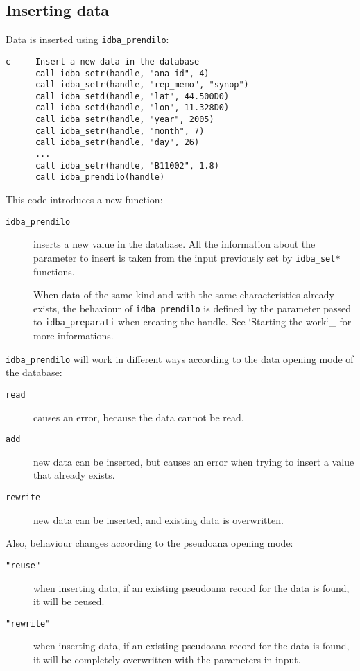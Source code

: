 \documentclass[final,12pt,a4paper,twoside]{book}
\begin{document}
\subsection {Inserting data}

Data is inserted using {\tt idba\_prendilo}:
\label{fun-idba_prendilo}
         
\begin{verbatim}
c     Insert a new data in the database
      call idba_setr(handle, "ana_id", 4)
      call idba_setr(handle, "rep_memo", "synop")
      call idba_setd(handle, "lat", 44.500D0)
      call idba_setd(handle, "lon", 11.328D0)
      call idba_setr(handle, "year", 2005)
      call idba_setr(handle, "month", 7)
      call idba_setr(handle, "day", 26)
      ...
      call idba_setr(handle, "B11002", 1.8)
      call idba_prendilo(handle)
\end{verbatim}

This code introduces a new function:

\begin{description}
\item[{\tt idba\_prendilo}]
  inserts a new value in the database.  All the information about the parameter
  to insert is taken from the input previously set by {\tt idba\_set*} functions.

  When data of the same kind and with the same characteristics already exists,
  the behaviour of {\tt idba\_prendilo} is defined by the parameter passed to
  {\tt idba\_preparati} when creating the handle.  See `Starting the work`\_ for
  more informations.
\end{description}

{\tt idba\_prendilo} will work in different ways according to the data opening
mode of the database:

\begin{description}
\item[{\tt read}]
  causes an error, because the data cannot be read.
\item[{\tt add}]
  new data can be inserted, but causes an error when trying to insert a value
  that already exists.
\item[{\tt rewrite}]
  new data can be inserted, and existing data is overwritten.
\end{description}

Also, behaviour changes according to the pseudoana opening mode:

\begin{description}
\item[{\tt "reuse"}] when inserting data, if an existing pseudoana record for
	       the data is found, it will be reused.
\item[{\tt "rewrite"}] when inserting data, if an existing pseudoana record for
	     the data is found, it will be completely overwritten with
	     the parameters in input.
\end{description}
\end{document}
